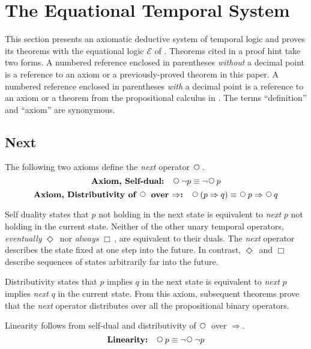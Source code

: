 \documentclass[12pt, fleqn, leqno]{article}
\newcommand{\impl}{\ensuremath{\Rightarrow}}        %
\newcommand{\Next}{\;\,\text{\raisebox{3.5pt}{\circle{6}}}}
\newcommand{\Event}{\Diamond\,}
\newcommand{\Always}{\Box\,}
\begin{document}
\section{The Equational Temporal System}

This section presents an axiomatic deductive system of temporal logic and proves its theorems with the equational
logic $\mathcal{E}$ of \cite{LADM}.
Theorems cited in a proof hint take two forms.
A numbered reference enclosed in parentheses \textit{without} a decimal point is a reference to an axiom or a previously-proved
theorem in this paper.
A numbered reference enclosed in parentheses \textit{with} a decimal point is a reference to an axiom or a
theorem from the propositional calculus in \cite{LADM}.
The terms ``definition'' and ``axiom'' are synonymous.

\subsection{Next}\label{section-next}

The following two axioms define the \textit{next} operator $\Next$.
\begin{equation}\label{E:selfDual}
\textbf{Axiom, Self-dual:}\quad \Next\neg p \equiv \neg\Next p
\end{equation}
\begin{equation}\label{E:distNextImp}
\textbf{Axiom, Distributivity of $\Next$ over $\impl$:}\quad \Next (p \impl q) \equiv \Next p \impl \Next q
\end{equation}

Self duality states that $p$ not holding in the next state is equivalent to \textit{next} $p$ not holding in the current state.
Neither of the other unary temporal operators, \textit{eventually} $\Event$ nor \textit{always} $\Always$, are equivalent to their duals.
The \textit{next} operator describes the state fixed at one step into the future.
In contrast, $\Event$ and $\Always$ describe sequences of states arbitrarily far into the future.

Distributivity states that $p$ implies $q$ in the next state is equivalent to \textit{next} $p$ implies \textit{next} $q$ in the current state.
From this axiom, subsequent theorems prove that the \textit{next} operator distributes over all the propositional binary operators.

Linearity follows from self-dual and distributivity of $\Next$ over $\impl$.
\begin{equation}\label{E:linearity}
\textbf{Linearity:}\quad \Next p \equiv \neg\Next\neg p
\end{equation}
\end{document}
